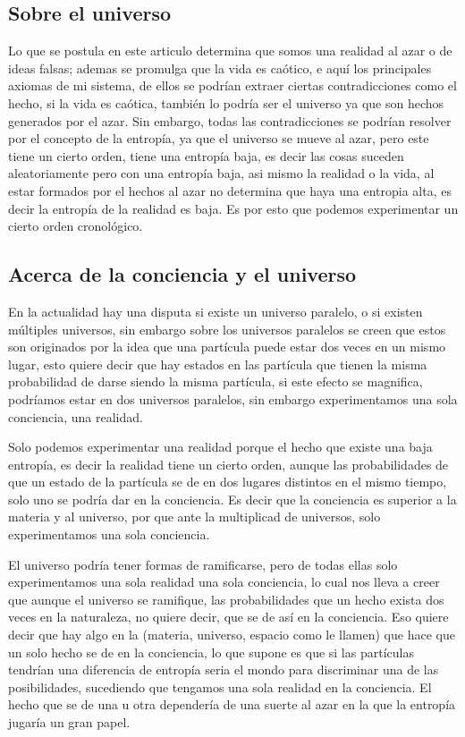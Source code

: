 \documentclass[12pt,letterpaper, a4paper ]{article}
\begin{document}
\subsection{Sobre el universo}
Lo que se postula en este articulo determina que somos una realidad al azar o de ideas falsas; ademas se promulga que la vida es caótico, e aquí los principales axiomas de mi sistema, de ellos se podrían extraer ciertas contradicciones como el hecho, si la vida es caótica, también lo podría ser el universo ya que son hechos generados por el azar. Sin embargo, todas las contradicciones se podrían resolver por el concepto de la entropía, ya que el universo se mueve al azar, pero este tiene un cierto orden, tiene una entropía baja, es decir las cosas suceden aleatoriamente pero con una entropía baja, asi mismo la realidad o la vida, al estar formados por el hechos al azar no determina que haya una entropia alta, es decir la entropía de la realidad es baja. Es por esto que podemos experimentar un cierto orden cronológico.


\subsection{Acerca de la conciencia y el universo}
En la actualidad hay una disputa si existe un universo paralelo, o si existen múltiples universos, sin embargo sobre los universos paralelos se creen que estos son originados por la idea que una partícula puede estar dos veces en un mismo lugar, esto quiere decir que hay estados en las partícula  que tienen la misma probabilidad de darse siendo la misma partícula, si este efecto se magnifica, podríamos estar en dos universos paralelos, sin embargo experimentamos una sola conciencia, una realidad.

Solo podemos experimentar una realidad porque el hecho que existe una baja entropía, es decir la realidad tiene un cierto orden, aunque las probabilidades de que un estado de la partícula se de en dos lugares distintos en el mismo tiempo, solo uno se podría dar en la conciencia. Es decir que la conciencia es superior a la materia y al universo, por que ante la multiplicad de universos, solo experimentamos una sola conciencia. 

El universo podría tener formas de ramificarse, pero de todas ellas solo experimentamos una sola realidad una sola conciencia, lo cual nos lleva a creer que aunque el universo se ramifique, las probabilidades que un hecho exista dos veces en la naturaleza, no quiere decir, que se de así en la conciencia. Eso quiere decir que hay algo en la (materia, universo, espacio como le llamen) que hace que un solo hecho se de en la conciencia, lo que supone es que si las partículas tendrían una diferencia de entropía seria el mondo para discriminar una de las posibilidades, sucediendo que tengamos una sola realidad en la conciencia. El hecho que se de una u otra dependería de una suerte al azar en la que la entropía jugaría un gran papel.
\end{document}

